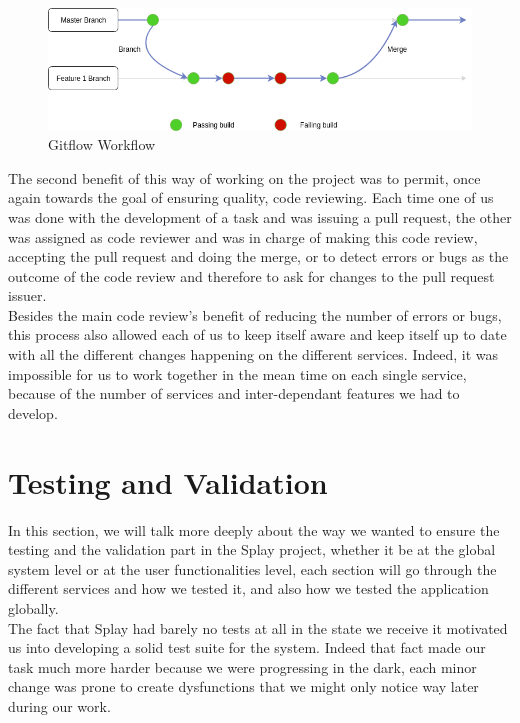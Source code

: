 \documentclass{eplmastersthesis}
\begin{document}
          \begin{figure}[H]
            \centering
            \includegraphics[scale=0.6]{figures/gitflow.png}
            \caption{\label{prev_arch} Gitflow Workflow}
          \end{figure}

          The second benefit of this way of working on the project was to
          permit, once again towards the goal of ensuring quality, code
          reviewing. Each time one of us was done with the development of a
          task and was issuing a pull request, the other was assigned as code
          reviewer and was in charge of making this code review, accepting the
          pull request and doing the merge, or to detect errors or bugs as the
          outcome of the code review and therefore to ask for changes to the
          pull request issuer.\\
          Besides the main code review's benefit of reducing the number of
          errors or bugs, this process also allowed each of us to keep itself
          aware and keep itself up to date with all the different changes
          happening on the different services. Indeed, it was impossible for
          us to work together in the mean time on each single service, because
          of the number of services and inter-dependant features we had to
          develop.

    \section{Testing and Validation}

      In this section, we will talk more deeply about the way we wanted to ensure
      the testing and the validation part in the Splay project, whether it be
      at the global system level or at the user functionalities level, each
      section will go through the different services and how we tested it, and
      also how we tested the application globally.\\

      The fact that Splay had barely no tests at all in the state we receive it
      motivated us into developing a solid test suite for the system.
      Indeed that fact made our task much more harder because we were progressing
      in the dark, each minor change was prone to create dysfunctions that we
      might only notice way later during our work.\\
\end{document}

